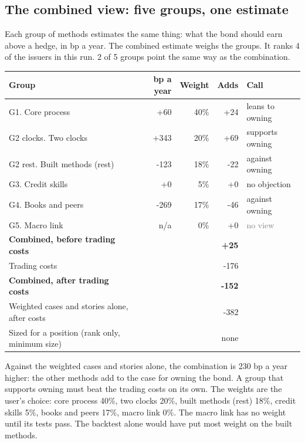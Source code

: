 \documentclass[11pt,a4paper]{article}
\begin{document}
\subsection*{The combined view: five groups, one estimate}
Each group of methods estimates the same thing: what the bond should earn above a hedge, in bp a year. The combined estimate weighs the groups. It ranks 4 of the issuers in this run. 2 of 5 groups point the same way as the combination.
\begin{center}\footnotesize\setlength{\tabcolsep}{3.5pt}\begin{tabular}{@{}lrrrl@{}}\toprule
Group & bp a year & Weight & Adds & Call \\\midrule
G1. Core process & +60 & 40\% & +24 & \textcolor{amber}{leans to owning} \\
G2 clocks. Two clocks & +343 & 20\% & +69 & \textcolor{good}{supports owning} \\
G2 rest. Built methods (rest) & -123 & 18\% & -22 & \textcolor{bad}{against owning} \\
G3. Credit skills & +0 & 5\% & +0 & \textcolor{good}{no objection} \\
G4. Books and peers & -269 & 17\% & -46 & \textcolor{bad}{against owning} \\
G5. Macro link & n/a & 0\% & +0 & \textcolor{gray}{no view} \\
\textbf{Combined, before trading costs} &  &  & \textbf{+25} &  \\
Trading costs &  &  & -176 &  \\
\textbf{Combined, after trading costs} &  &  & \textbf{-152} &  \\
Weighted cases and stories alone, after costs &  &  & -382 &  \\
Sized for a position (rank only, minimum size) &  &  & none &  \\
\bottomrule\end{tabular}\end{center}
Against the weighted cases and stories alone, the combination is 230 bp a year higher: the other methods add to the case for owning the bond. A group that supports owning must beat the trading costs on its own. The weights are the user's choice: core process 40\%, two clocks 20\%, built methods (rest) 18\%, credit skills 5\%, books and peers 17\%, macro link 0\%. The macro link has no weight until its tests pass. The backtest alone would have put most weight on the built methods.
\par\noindent{}
\end{document}
